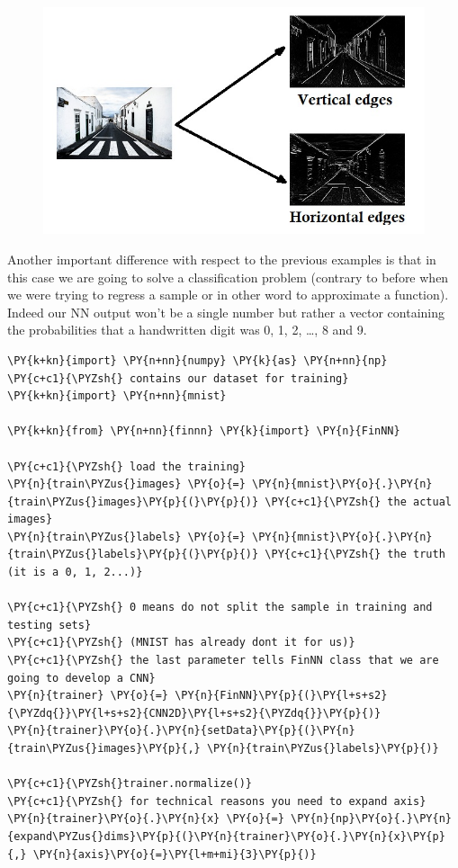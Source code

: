 \begin{figure}[htb]
	\centering
	\includegraphics{figures/edges.jpg}
\end{figure}

Another important difference with respect to the previous examples is
that in this case we are going to solve a classification problem
(contrary to before when we were trying to regress a sample or in other
word to approximate a function). Indeed our NN output won't be a single
number but rather a vector containing the probabilities that a
handwritten digit was 0, 1, 2, \ldots{}, 8 and 9.

    \begin{tcolorbox}[breakable, size=fbox, boxrule=1pt, pad at break*=1mm,colback=cellbackground, colframe=cellborder]
\begin{Verbatim}[commandchars=\\\{\}]
\PY{k+kn}{import} \PY{n+nn}{numpy} \PY{k}{as} \PY{n+nn}{np}
\PY{c+c1}{\PYZsh{} contains our dataset for training}
\PY{k+kn}{import} \PY{n+nn}{mnist} 

\PY{k+kn}{from} \PY{n+nn}{finnn} \PY{k}{import} \PY{n}{FinNN}

\PY{c+c1}{\PYZsh{} load the training}
\PY{n}{train\PYZus{}images} \PY{o}{=} \PY{n}{mnist}\PY{o}{.}\PY{n}{train\PYZus{}images}\PY{p}{(}\PY{p}{)} \PY{c+c1}{\PYZsh{} the actual images}
\PY{n}{train\PYZus{}labels} \PY{o}{=} \PY{n}{mnist}\PY{o}{.}\PY{n}{train\PYZus{}labels}\PY{p}{(}\PY{p}{)} \PY{c+c1}{\PYZsh{} the truth (it is a 0, 1, 2...)}

\PY{c+c1}{\PYZsh{} 0 means do not split the sample in training and testing sets}
\PY{c+c1}{\PYZsh{} (MNIST has already dont it for us)}
\PY{c+c1}{\PYZsh{} the last parameter tells FinNN class that we are going to develop a CNN}
\PY{n}{trainer} \PY{o}{=} \PY{n}{FinNN}\PY{p}{(}\PY{l+s+s2}{\PYZdq{}}\PY{l+s+s2}{CNN2D}\PY{l+s+s2}{\PYZdq{}}\PY{p}{)}
\PY{n}{trainer}\PY{o}{.}\PY{n}{setData}\PY{p}{(}\PY{n}{train\PYZus{}images}\PY{p}{,} \PY{n}{train\PYZus{}labels}\PY{p}{)}

\PY{c+c1}{\PYZsh{}trainer.normalize()}
\PY{c+c1}{\PYZsh{} for technical reasons you need to expand axis}
\PY{n}{trainer}\PY{o}{.}\PY{n}{x} \PY{o}{=} \PY{n}{np}\PY{o}{.}\PY{n}{expand\PYZus{}dims}\PY{p}{(}\PY{n}{trainer}\PY{o}{.}\PY{n}{x}\PY{p}{,} \PY{n}{axis}\PY{o}{=}\PY{l+m+mi}{3}\PY{p}{)}
\end{Verbatim}
\end{tcolorbox}


